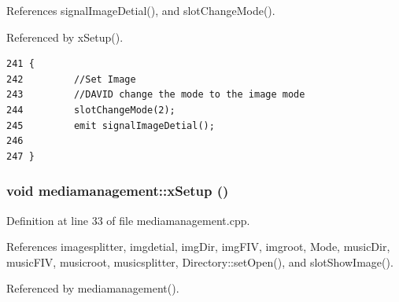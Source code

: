 References signal\-Image\-Detial(), and slot\-Change\-Mode().

Referenced by x\-Setup().



\footnotesize\begin{verbatim}241 {
242         //Set Image
243         //DAVID change the mode to the image mode
244         slotChangeMode(2);
245         emit signalImageDetial();
246         
247 }
\end{verbatim}\normalsize 
{}
\subsubsection{\setlength{\rightskip}{0pt plus 5cm}void mediamanagement::x\-Setup ()\hspace{0.3cm}{\tt  [private]}}\label{classmediamanagement_mediamanagementd0}




Definition at line 33 of file mediamanagement.cpp.

References imagesplitter, imgdetial, img\-Dir, img\-FIV, imgroot, Mode, music\-Dir, music\-FIV, musicroot, musicsplitter, Directory::set\-Open(), and slot\-Show\-Image().

Referenced by mediamanagement().



